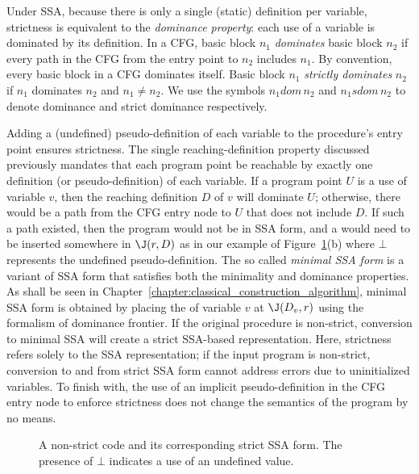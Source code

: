 Under SSA, because there is only a single
(static) definition per variable, strictness is equivalent to the
\emph{dominance property}: each use of a variable is dominated by
its definition.
In a CFG, basic block $n_{1}$ \emph{dominates} basic block $n_{2}$
if every path in the CFG from the entry point to $n_{2}$ includes
$n_{1}$. By convention, every basic block in a CFG dominates itself. Basic 
block $n_{1}$ \emph{strictly dominates} $n_{2}$ if $n_{1}$ dominates
$n_{2}$ and $n_{1} \neq n_{2}$. We use the symbols $n_{1} dom\, n_{2}$
and $n_{1} sdom\, n_{2}$ to denote dominance and strict dominance 
respectively.


Adding a (undefined) pseudo-definition of each variable to the procedure's entry
point ensures strictness. 
The single reaching-definition property discussed previously mandates that each
program point be reachable by exactly one definition (or pseudo-definition)
of each variable. If a program point $U$ is a use of variable $v$, then the
reaching definition $D$ of $v$ will dominate $U$; otherwise, there would be a path
from the CFG entry node to $U$ that does not include $D$. If such a  path existed, then the program would not be in SSA form, and a \phifun would need to be inserted somewhere
in $\J(r,D)$ as in our example of Figure~\ref{fig:properties_and_flavors:dom_property}(b) where $\bot$ represents the undefined pseudo-definition. The so called \emph{minimal SSA form} is a variant of SSA form that satisfies both the minimality and dominance properties. As shall be seen in Chapter~\ref{chapter:classical_construction_algorithm}, minimal SSA form is obtained by placing the \phifuns of variable $v$ at $\J(D_v,r)$ using the formalism of dominance frontier.
If the original procedure is non-strict, conversion to minimal SSA
will create a strict SSA-based representation. Here, strictness refers
solely to the SSA representation; if the input program is non-strict,
conversion to and from strict SSA form cannot address errors due
to uninitialized variables. To finish with, the use of an implicit pseudo-definition in the CFG entry node to enforce strictness does not change the semantics of the program by no means.


\begin{figure}
\caption{\label{fig:properties_and_flavors:dom_property}A non-strict code and its corresponding strict SSA form. The presence of $\bot$ indicates a use of an undefined value.}
\end{figure}



